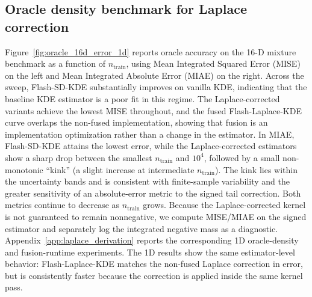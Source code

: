 \subsection{Oracle density benchmark for Laplace correction}
Figure~\ref{fig:oracle_16d_error_1d} reports oracle accuracy on the 16-D mixture benchmark as a function of $n_{\text{train}}$, using Mean Integrated Squared Error (MISE) on the left and Mean Integrated Absolute Error (MIAE) on the right. 
Across the sweep, Flash-SD-KDE substantially improves on vanilla KDE, indicating that the baseline KDE estimator is a poor fit in this regime. 
The Laplace-corrected variants achieve the lowest MISE throughout, and the fused Flash-Laplace-KDE curve overlaps the non-fused implementation, showing that fusion is an implementation optimization rather than a change in the estimator. 
In MIAE, Flash-SD-KDE attains the lowest error, while the Laplace-corrected estimators show a sharp drop between the smallest $n_{\text{train}}$ and $10^4$, followed by a small non-monotonic “kink” (a slight increase at intermediate $n_{\text{train}}$). 
The kink lies within the uncertainty bands and is consistent with finite-sample variability and the greater sensitivity of an absolute-error metric to the signed tail correction. 
Both metrics continue to decrease as $n_{\text{train}}$ grows. Because the Laplace-corrected kernel is not guaranteed to remain nonnegative, we compute MISE/MIAE on the signed estimator and separately log the integrated negative mass as a diagnostic.
Appendix~\ref{app:laplace_derivation} reports the corresponding 1D oracle-density
and fusion-runtime experiments.  The 1D results show the same estimator-level
behavior: Flash-Laplace-KDE matches the non-fused Laplace correction in error,
but is consistently faster because the correction is applied inside the same
kernel pass.

